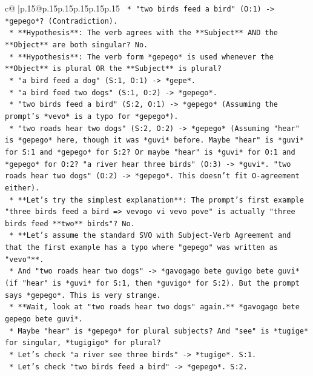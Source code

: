 \documentclass{article}
\begin{document}
{\begin{supertabular}{c@{$\;$}|p{.15\linewidth}@{}p{.15\linewidth}p{.15\linewidth}p{.15\linewidth}p{.15\linewidth}p{.15\linewidth}}
{{{\texttt{                        *   "two birds feed a bird" (O:1) {-}> *gepego*? (Contradiction).} \\
\texttt{                    *   **Hypothesis**: The verb agrees with the **Subject** AND the **Object** are both singular? No.} \\
\texttt{                    *   **Hypothesis**: The verb form *gepego* is used whenever the **Object** is plural OR the **Subject** is plural?} \\
\texttt{                        *   "a bird feed a dog" (S:1, O:1) {-}> *gepe*.} \\
\texttt{                        *   "a bird feed two dogs" (S:1, O:2) {-}> *gepego*.} \\
\texttt{                        *   "two birds feed a bird" (S:2, O:1) {-}> *gepego* (Assuming the prompt's *vevo* is a typo for *gepego*).} \\
\texttt{                        *   "two roads hear two dogs" (S:2, O:2) {-}> *gepego* (Assuming "hear" is *gepego* here, though it was *guvi* before. Maybe "hear" is *guvi* for S:1 and *gepego* for S:2? Or maybe "hear" is *guvi* for O:1 and *gepego* for O:2? "a river hear three birds" (O:3) {-}> *guvi*. "two roads hear two dogs" (O:2) {-}> *gepego*. This doesn't fit O{-}agreement either).} \\
\texttt{                    *   **Let's try the simplest explanation**: The prompt's first example "three birds feed a bird => vevogo vi vevo pove" is actually "three birds feed **two** birds"? No.} \\
\texttt{                    *   **Let's assume the standard SVO with Subject{-}Verb Agreement and that the first example has a typo where "gepego" was written as "vevo"**.} \\
\texttt{                    *   And "two roads hear two dogs" {-}> *gavogago bete guvigo bete guvi* (if "hear" is *guvi* for S:1, then *guvigo* for S:2). But the prompt says *gepego*. This is very strange.} \\
\texttt{                    *   **Wait, look at "two roads hear two dogs" again.** *gavogago bete gepego bete guvi*.} \\
\texttt{                        *   Maybe "hear" is *gepego* for plural subjects? And "see" is *tugige* for singular, *tugigigo* for plural?} \\
\texttt{                        *   Let's check "a river see three birds" {-}> *tugige*. S:1.} \\
\texttt{                        *   Let's check "two birds feed a bird" {-}> *gepego*. S:2.} \\
}}}
\end{supertabular}}
\end{document}
